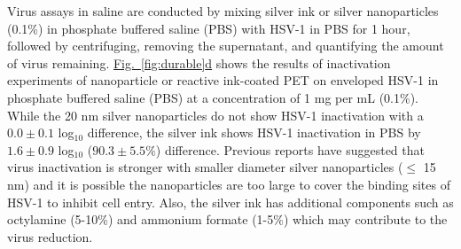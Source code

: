 \documentclass[journal=jacsat,manuscript=article]{achemso}
\newcommand{\figref}[2][]{\hyperref[#2]{Fig.~\ref{#2}#1}}
\begin{document}
Virus assays in saline are conducted by mixing silver ink or silver nanoparticles (0.1\%) in phosphate buffered saline (PBS) with HSV-1 in PBS for 1 hour, followed by centrifuging, removing the supernatant, and quantifying the amount of virus remaining. \figref[d]{fig:durable} shows the results of inactivation experiments of nanoparticle or reactive ink-coated PET  %
on enveloped HSV-1 in phosphate buffered saline (PBS) at a concentration of 1 mg per mL (0.1\%). 
While the 20 nm silver nanoparticles do not show HSV-1 inactivation with a $0.0 \pm 0.1$ log$_{10}$ difference, the silver ink shows HSV-1 inactivation in PBS by $1.6 \pm 0.9$ log$_{10}$ ($90.3 \pm 5.5 \%$) difference. 
Previous reports have suggested that virus inactivation is stronger with smaller diameter silver nanoparticles ($\leq$ 15 nm) and it is possible the nanoparticles are too large to cover the binding sites of HSV-1 to inhibit cell entry.\cite{jeremiah_potent_2020}
Also, the silver ink has additional components such as octylamine (5-10\%) and ammonium formate (1-5\%) which may contribute to the virus reduction. 
\end{document}
